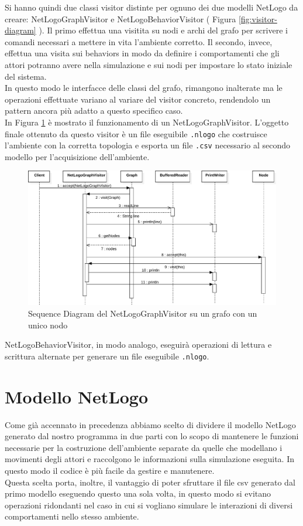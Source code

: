 Si hanno quindi due classi visitor distinte per ognuno dei due modelli NetLogo da creare: NetLogoGraphVisitor e NetLogoBehaviorVisitor ( Figura \ref{fig:visitor-diagram} ). Il primo effettua una visitita su nodi e archi del grafo per scrivere i comandi necessari a mettere in vita l'ambiente corretto. Il secondo, invece, effettua una visita sui behaviors in modo da definire i comportamenti che gli attori potranno avere nella simulazione e sui nodi per impostare lo stato iniziale del sistema.\\
In questo modo le interfacce delle classi del grafo, rimangono inalterate ma le operazioni effettuate variano al variare del visitor concreto, rendendolo un pattern ancora più adatto a questo specifico caso.\\
In Figura \ref{fig:visitor-sequence} è mostrato il funzionamento di un NetLogoGraphVisitor. L'oggetto finale ottenuto da questo visitor è un file eseguibile \texttt{.nlogo} che costruisce l'ambiente con la corretta topologia e esporta un file \texttt{.csv} necessario al secondo modello per l'acquisizione dell'ambiente.\\
\begin{figure}[htbp]
\centering
\includegraphics[width=\textwidth,height=\textheight,keepaspectratio]{images/visitor-sequence.pdf}
\caption{Sequence Diagram del NetLogoGraphVisitor su un grafo con un unico nodo}
\label{fig:visitor-sequence}
\end{figure}
NetLogoBehaviorVisitor, in modo analogo, eseguirà operazioni di lettura e scrittura alternate per generare un file eseguibile \texttt{.nlogo}.

\section{Modello NetLogo}
Come già accennato in precedenza abbiamo scelto di dividere il modello NetLogo generato dal nostro programma in due parti con lo scopo di mantenere le funzioni necessarie per la costruzione dell'ambiente separate da quelle che modellano i movimenti degli attori e raccolgono le informazioni sulla simulazione eseguita. In questo modo il codice è più facile da gestire e manutenere.\\
Questa scelta porta, inoltre, il vantaggio di poter sfruttare il file csv generato dal primo modello eseguendo questo una sola volta, in questo modo si evitano operazioni ridondanti nel caso in cui si vogliano simulare le interazioni di diversi comportamenti nello stesso ambiente.
